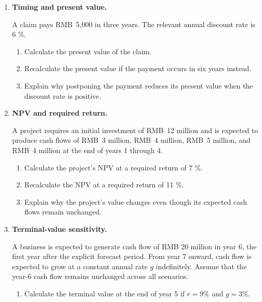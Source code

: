 \begin{enumerate}

\item \textbf{Timing and present value.}

A claim pays RMB~5,000 in three years. The relevant annual discount rate is 6 \%.

\begin{enumerate}

\item Calculate the present value of the claim.

\item Recalculate the present value if the payment occurs in six years instead.

\item Explain why postponing the payment reduces its present value when the discount rate is positive.

\end{enumerate}


\item \textbf{NPV and required return.}

A project requires an initial investment of RMB~12 million and is expected to produce cash flows of RMB~3 million, RMB~4 million, RMB~5 million, and RMB~4 million at the end of years 1 through 4.

\begin{enumerate}

\item Calculate the project's NPV at a required return of 7 \%.

\item Recalculate the NPV at a required return of 11 \%.

\item Explain why the project's value changes even though its expected cash flows remain unchanged.

\end{enumerate}


\item \textbf{Terminal-value sensitivity.}

A business is expected to generate cash flow of RMB 20 million in year 6, the first year after the explicit forecast period. From year 7 onward, cash flow is expected to grow at a constant annual rate \(g\) indefinitely. Assume that the year-6 cash flow remains unchanged across all scenarios.

\begin{enumerate}

\item Calculate the terminal value at the end of year 5 if $r=9\%$ and $g=3\%$.


\end{enumerate}
\end{enumerate}
